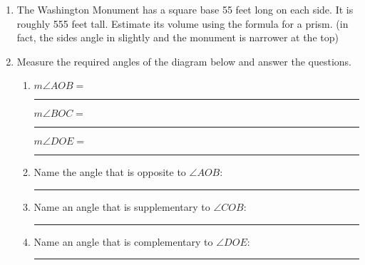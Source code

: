 \documentclass[12pt, twoside]{article}
\begin{document}
\begin{enumerate}
\newpage
  \item The Washington Monument has a square base 55 feet long on each side. It is roughly 555 feet tall. Estimate its volume using the formula for a prism. (in fact, the sides angle in slightly and the monument is narrower at the top)  \vspace{7cm}  

  \item Measure the required angles of the diagram below and answer the questions. \vspace{0.25cm}
  \begin{enumerate}
    \item  $m \angle AOB = $ \rule{2.5cm}{0.15mm} \hspace{0.5cm} $m \angle BOC = $ \rule{2.5cm}{0.15mm} \hspace{0.5cm} $m \angle DOE = $ \rule{2.5cm}{0.15mm}\bigskip
    \item Name the angle that is opposite to $\angle AOB$: \rule{4cm}{0.15mm}  \bigskip
    \item Name an angle that is supplementary to $\angle COB$: \rule{4cm}{0.15mm} \bigskip
    \item Name an angle that is complementary to $\angle DOE$: \rule{4cm}{0.15mm}
  \end{enumerate}
  \vspace{1cm}
  \begin{center}
  \end{center}

  \newpage

\end{enumerate}
\end{document}

